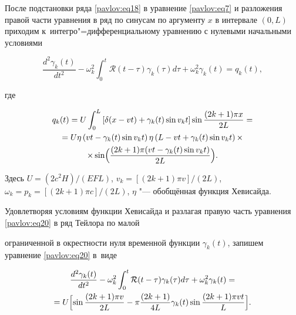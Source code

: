 После подстановки ряда \eqref{pavlov:eq18} в уравнение \eqref{pavlov:eq7} и разложения правой части уравнения в ряд по синусам по аргументу $x$ в интервале $(0,L)$ приходим к~интегро"=дифференциальному уравнению с нулевыми начальными условиями

\begin{equation}

\label{pavlov:eq20}

\frac{d^2\gamma _k (t)}{dt^2}-\omega_k^2 \int_0^t \mathcal{R}(t-\tau )\gamma _k (\tau )d\tau +\omega _k^2 \gamma _k (t)=q_k (t),

\end{equation}

где

\begin{multline}

\label{pavlov:eq21}

q_k (t)=U\int_0^L \left[\delta (x- v  t)+\gamma _k (t)\sin v_k t \right]

\sin \frac{(2k+1)\pi x}{2L} = \\

=U\eta \left( v  t-\gamma _k (t)\sin v_k t \right) \eta \left(L- v  t+\gamma _k (t)\sin v_k t

\right)\times \\ 

\times  \sin \Bigl(\frac{(2k+1)\pi ( v  t-\gamma _k

(t)\sin v_k t)}{2L} \Bigr).

\end{multline}

Здесь $U=(2c^2H)/(EFL)$, $v_k =[(2k+1)\pi  v ]/(2L)$, $\omega

_k =p_k =[(2k+1)\pi c]/(2L)$, $\eta $ "--- обобщённая функция Хевисайда. 

Удовлетворяя условиям функции Хевисайда и разлагая правую часть уравнения \eqref{pavlov:eq20} в ряд Тейлора по малой

ограниченной в окрестности нуля временной функции $\gamma _k (t)$, запишем уравнение \eqref{pavlov:eq20} в~виде

\begin{multline}

\label{pavlov:eq22}

\frac{d^2\gamma _k (t)}{dt^2}-\omega _k^2

\int_0^t \mathcal{R}(t-\tau )\gamma _k (\tau )d\tau +\omega _k^2 \gamma _k (t) = \\

=U\Bigl[\sin \frac{(2k+1)\pi  v  }{2L}-\pi \frac{(2k+1)}{4L}\gamma _k (t)\sin \frac{(2k+1)\pi  v 

t}{L}\Bigr] .

\end{multline}

